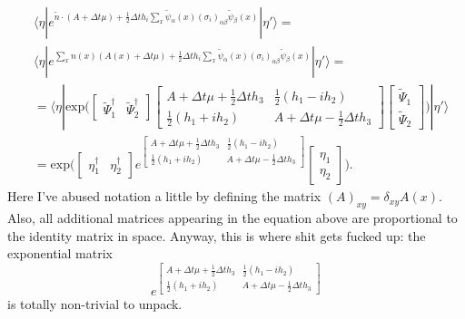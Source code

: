 \begin{align*}
& \langle \eta | e^{ \tilde{n} \cdot (A+\Delta t \mu) + \frac{1}{2}  \Delta t h_i \sum_x \tilde{\psi}_{\alpha}(x) (\sigma_i)_{\alpha \beta} \tilde{\psi}_{\beta}(x) } | \eta' \rangle = \\
& \langle \eta | e^{ \sum_x n(x) (A(x)+\Delta t \mu) + \frac{1}{2}  \Delta t h_i \sum_x \tilde{\psi}_{\alpha}(x) (\sigma_i)_{\alpha \beta} \tilde{\psi}_{\beta}(x) } | \eta' \rangle = \\ 
& =
\langle \eta | \text{exp}\Bigg( 
\begin{bmatrix} \tilde{\Psi}^{\dagger}_{1} &  \tilde{\Psi}^{\dagger}_{2}  \end{bmatrix} 
\begin{bmatrix}
A + \Delta t \mu + \frac{1}{2}\Delta t h_3 & \frac{1}{2}(h_1 - i h_2) \\
\frac{1}{2}(h_1 + i h_2) & A + \Delta t \mu - \frac{1}{2}\Delta t h_3 
\end{bmatrix} 
\begin{bmatrix} \tilde{\Psi}_{1} \\  \tilde{\Psi}_{2}  \end{bmatrix} \Bigg)
| \eta' \rangle \\
& =
\text{exp}\Bigg( 
\begin{bmatrix} \eta^{\dagger}_{1} &  \eta^{\dagger}_{2}  \end{bmatrix} 
e^{\begin{bmatrix}
A + \Delta t \mu + \frac{1}{2}\Delta t h_3 & \frac{1}{2}(h_1 - i h_2) \\
\frac{1}{2}(h_1 + i h_2) & A + \Delta t \mu - \frac{1}{2}\Delta t h_3 
\end{bmatrix}}
\begin{bmatrix} \eta_{1} \\  \eta_{2}  \end{bmatrix} \Bigg) .
\end{align*}
Here I've abused notation a little by defining the matrix $(A)_{xy} = \delta_{xy} A(x)$. Also, all additional matrices appearing in the equation above are proportional to the identity matrix in space. Anyway, this is where shit gets fucked up: the exponential matrix
\begin{equation*}
e^{\begin{bmatrix}
A + \Delta t \mu + \frac{1}{2}\Delta t h_3 & \frac{1}{2}(h_1 - i h_2) \\
\frac{1}{2}(h_1 + i h_2) & A + \Delta t \mu - \frac{1}{2}\Delta t h_3 
\end{bmatrix}}
\end{equation*}
is totally non-trivial to unpack.

